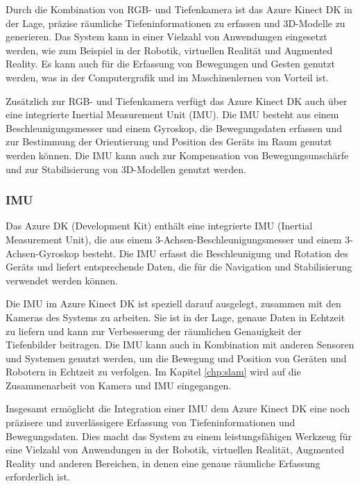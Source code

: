         
    
        Durch die Kombination von RGB- und Tiefenkamera ist das Azure Kinect \ac{DK} in der Lage, präzise räumliche Tiefeninformationen zu erfassen und 3D-Modelle zu generieren. Das System kann in einer Vielzahl von Anwendungen eingesetzt werden, wie zum Beispiel in der Robotik, virtuellen Realität und Augmented Reality. Es kann auch für die Erfassung von Bewegungen und Gesten genutzt werden, was in der Computergrafik und im Maschinenlernen von Vorteil ist.


        Zusätzlich zur RGB- und Tiefenkamera verfügt das Azure Kinect \ac{DK} auch über eine integrierte Inertial Measurement Unit (\ac{IMU}). Die \ac{IMU} besteht aus einem Beschleunigungsmesser und einem Gyroskop, die Bewegungsdaten erfassen und zur Bestimmung der Orientierung und Position des Geräts im Raum genutzt werden können. Die \ac{IMU} kann auch zur Kompensation von Bewegungsunschärfe und zur Stabilisierung von 3D-Modellen genutzt werden.

\subsubsection{\acl{IMU}}

Das Azure DK (Development Kit) enthält eine integrierte IMU (Inertial Measurement Unit), die aus einem 3-Achsen-Beschleunigungsmesser und einem 3-Achsen-Gyroskop besteht. Die IMU erfasst die Beschleunigung und Rotation des Geräts und liefert entsprechende Daten, die für die Navigation und Stabilisierung verwendet werden können.

Die \ac{IMU} im Azure Kinect \ac{DK} ist speziell darauf ausgelegt, zusammen mit den Kameras des Systems zu arbeiten. Sie ist in der Lage, genaue Daten in Echtzeit zu liefern und kann zur Verbesserung der räumlichen Genauigkeit der Tiefenbilder beitragen. Die IMU kann auch in Kombination mit anderen Sensoren und Systemen genutzt werden, um die Bewegung und Position von Geräten und Robotern in Echtzeit zu verfolgen.
Im Kapitel \ref{chp:slam} wird auf die Zusammenarbeit von Kamera und IMU eingegangen.

Insgesamt ermöglicht die Integration einer \ac{IMU} dem Azure Kinect \ac{DK} eine noch präzisere und zuverlässigere Erfassung von Tiefeninformationen und Bewegungsdaten. Dies macht das System zu einem leistungsfähigen Werkzeug für eine Vielzahl von Anwendungen in der Robotik, virtuellen Realität, Augmented Reality und anderen Bereichen, in denen eine genaue räumliche Erfassung erforderlich ist.

